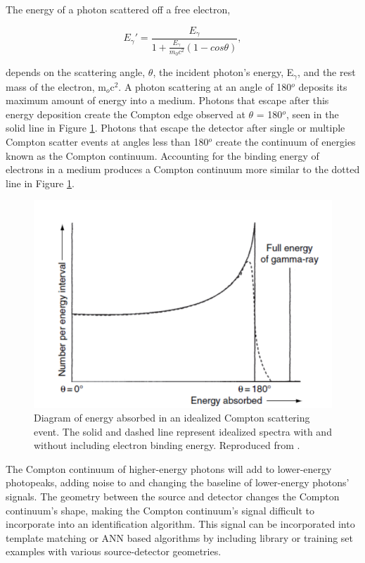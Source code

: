 The energy of a photon scattered off a free electron,

\begin{equation} \label{eq:compton_scatter}
E_{\gamma}' = \frac{E_{\gamma}}{1 + \frac{E_{\gamma}}{m_{0} c^2} (1-cos\theta)},
\end{equation}

depends on the scattering angle, $\theta$, the incident photon's energy, E$_{\gamma}$, and the rest mass of the electron, m$_{o}$c$^{2}$. A photon scattering at an angle of 180$^{o}$ deposits its maximum amount of energy into a medium. Photons that escape after this energy deposition create the Compton edge observed at $\theta$ = 180$^{o}$, seen in the solid line in Figure \ref{fig:ideal_compton}. Photons that escape the detector after single or multiple Compton scatter events at angles less than 180$^{o}$ create the continuum of energies known as the Compton continuum. Accounting for the binding energy of electrons in a medium produces a Compton continuum more similar to the dotted line in Figure \ref{fig:ideal_compton}.

\begin{figure}[H]
	\centering
	\includegraphics[width=0.75\linewidth]{images/ideal_compton}
	\caption{Diagram of energy absorbed in an idealized Compton scattering event. The solid and dashed line represent idealized spectra with and without including electron binding energy. Reproduced from \cite{gilmore}.}
	\label{fig:ideal_compton}
\end{figure}

The Compton continuum of higher-energy photons will add to lower-energy photopeaks, adding noise to and changing the baseline of lower-energy photons' signals. The geometry between the source and detector changes the Compton continuum's shape, making the Compton continuum's signal difficult to incorporate into an identification algorithm. This signal can be incorporated into template matching or ANN based algorithms by including library or training set examples with various source-detector geometries.




